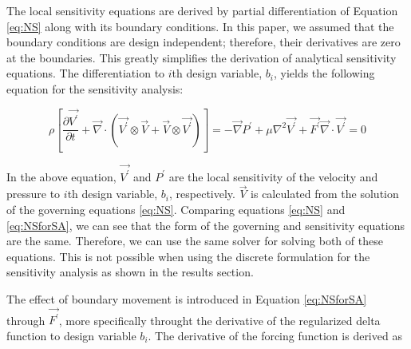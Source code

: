 \documentclass[12pt]{aiaa-pretty}
\begin{document}
The local sensitivity equations are derived by partial differentiation of Equation \eqref{eq:NS} along with its boundary conditions. In this paper, we assumed that the boundary conditions are design independent; therefore, their derivatives are zero at the boundaries. This greatly simplifies the derivation of analytical sensitivity equations. The differentiation to $i$th design variable, $b_i$, yields the following equation for the sensitivity analysis:

%
\begin{subequations}\label{eq:NSforSA}
\begin{equation}
	\rho \left[
	\frac{\partial \vec{V^\prime}}{\partial t} + 
	\vec{\nabla} \cdot \left( \vec{V^\prime} \otimes \vec{V} + \vec{V} \otimes \vec{V^\prime} \right) 
	\right] = 
	-\vec{\nabla} P^\prime + \mu \nabla^2 \vec{V^\prime} + \vec{F^\prime}
\end{equation}
\begin{equation}
	\vec{\nabla} \cdot \vec{V^\prime} = 0
\end{equation}
\end{subequations}
%

In the above equation, $\vec{V^\prime}$ and $P^\prime$ are the local sensitivity of the velocity and pressure to $i$th design variable, $b_i$, respectively. $\vec{V}$ is calculated from the solution of the governing equations \eqref{eq:NS}. Comparing equations \eqref{eq:NS} and \eqref{eq:NSforSA}, we can see that the form of the governing and sensitivity equations are the same. Therefore, we can use the same solver for solving both of these equations. This is not possible when using the discrete formulation for the sensitivity analysis as shown in the results section.

The effect of boundary movement is introduced in Equation \eqref{eq:NSforSA} through $\vec{F^\prime}$, more specifically throught the derivative of the regularized delta function to design variable $b_i$. The derivative of the forcing function is derived as
\end{document}
